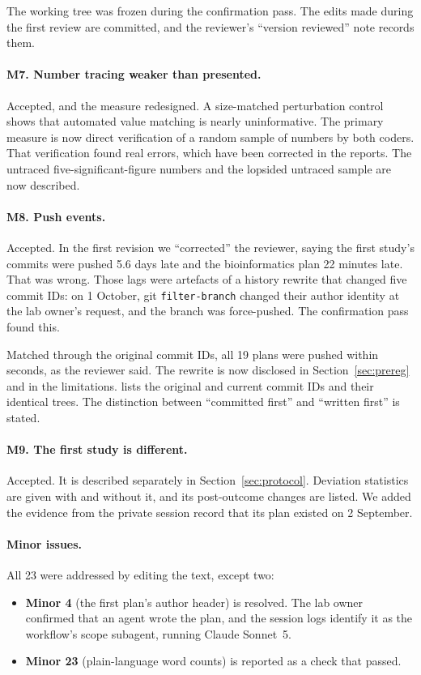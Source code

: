 The working tree was frozen during the confirmation pass. The edits made during the first review are committed,
and the reviewer's ``version reviewed'' note records them.

\paragraph{M7. Number tracing weaker than presented.} Accepted, and the measure redesigned. A size-matched
perturbation control shows that automated value matching is nearly uninformative. The primary measure is now direct
verification of a random sample of \VerifyN{} numbers by both coders. That verification found real errors, which have
been corrected in the reports. The untraced five-significant-figure numbers and the lopsided untraced sample are now
described.

\paragraph{M8. Push events.} Accepted. In the first revision we ``corrected'' the reviewer, saying the first study's
commits were pushed 5.6 days late and the bioinformatics plan 22 minutes late. That was wrong. Those lags were
artefacts of a history rewrite that changed five commit IDs: on 1 October, git \texttt{filter-branch} changed their
author identity at the lab owner's request, and the branch was force-pushed. The confirmation pass found this.

Matched through the original commit IDs, all 19 plans were pushed within seconds, as the reviewer said. The rewrite is
now disclosed in Section~\ref{sec:prereg} and in the limitations.  lists the original and
current commit IDs and their identical trees. The distinction between ``committed first'' and ``written first'' is
stated.

\paragraph{M9. The first study is different.} Accepted. It is described separately in Section~\ref{sec:protocol}.
Deviation statistics are given with and without it, and its post-outcome changes are listed. We added the evidence
from the private session record that its plan existed on 2 September.

\paragraph{Minor issues.} All 23 were addressed by editing the text, except two:
\begin{itemize}
\item \textbf{Minor 4} (the first plan's author header) is resolved. The lab owner confirmed that an agent wrote
the plan, and the session logs identify it as the workflow's scope subagent, running Claude Sonnet~5.
\item \textbf{Minor 23} (plain-language word counts) is reported as a check that passed.
\end{itemize}
